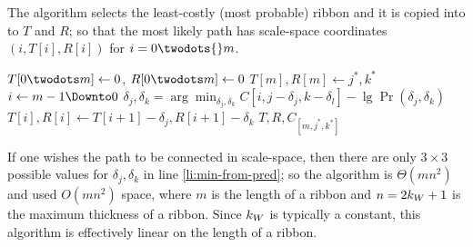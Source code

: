 The  algorithm selects the least-costly (most probable) ribbon and it is copied into to $T$ and $R$; so that the most likely path has scale-space coordinates $(i, T[i], R[i])$ for $i=0\twodots{}m$. 



\begin{codebox}
 \label{alg:backtrack-ribbon}
\li $T{[0{\twodots}m]} \gets 0$, \quad $R{[0{\twodots}m]} \gets 0$             
\li $T{[m]}, R{[m]} \gets j^*, k^*$ \label{li:backtrack-best-last}
\li \For $i \gets m-1 \Downto 0$ \Do
\li      $\delta_j, \delta_k = \displaystyle{\arg\min_{\delta_j,\delta_k}C{[i,j{-}\delta_j,k{-}\delta_l]}{-}\lg \Pr(\delta_j,\delta_k)}$
\li      $T{[i]}, R[i] \gets T{[i+1]}-\delta_j, R{[i+1]}-\delta_k$                                                 \label{li:backtack-choose-pred}
    \End
\li \Return $T, R, C_{[m, j^*, k^*]}$
\end{codebox}


If one wishes the path to be connected in scale-space, then there are only $3\times3$ possible values for $\delta_j, \delta_k$ in line \ref{li:min-from-pred}; so the algorithm is $\Theta(m n^2)$ and used $O(m n^2)$ space, where $m$ is the length of a ribbon and $n=2k_W+1$ is the maximum thickness of a ribbon. Since $k_W$ is typically a constant, this algorithm is effectively linear on the length of a ribbon.